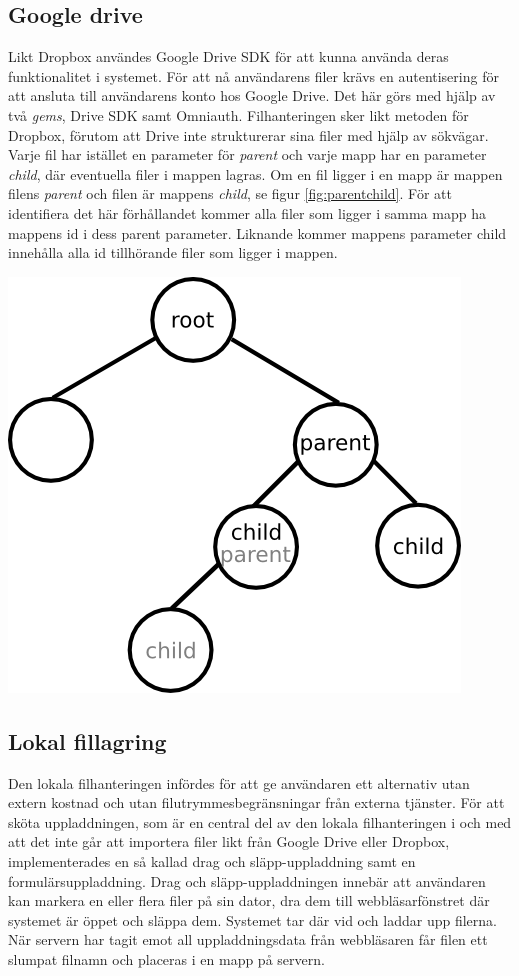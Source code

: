 \subsection{Google drive}
Likt Dropbox användes Google Drive SDK för att kunna använda deras funktionalitet i systemet. För att nå användarens filer krävs en autentisering för att ansluta till användarens konto hos Google Drive. Det här görs med hjälp av två \textit{gems}, Drive SDK samt Omniauth. Filhanteringen sker likt metoden för Dropbox, förutom att Drive inte strukturerar sina filer med hjälp av sökvägar. Varje fil har istället en parameter för \textit{parent} och varje mapp har en parameter \textit{child}, där eventuella filer i mappen lagras. Om en fil ligger i en mapp är mappen filens \textit{parent} och filen är mappens \textit{child}, se figur \ref{fig:parentchild}. För att identifiera det här förhållandet kommer alla filer som ligger i samma mapp ha mappens id i dess parent parameter. Liknande kommer mappens parameter child innehålla alla id tillhörande filer som ligger i mappen.

\begin{Figure}
  \centering
    \includegraphics[width=0.5\linewidth]{figures/pcarent2.png}
\end{Figure}

\subsection{Lokal fillagring} \label{sec:local}
Den lokala filhanteringen infördes för att ge användaren ett alternativ utan extern kostnad och utan filutrymmesbegränsningar från externa tjänster. För att sköta uppladdningen, som är en central del av den lokala filhanteringen i och med att det inte går att importera filer likt från Google Drive eller Dropbox, implementerades en så kallad drag och släpp-uppladdning samt en formulärsuppladdning. Drag och släpp-uppladdningen innebär att användaren kan markera en eller flera filer på sin dator, dra dem till webbläsarfönstret där systemet är öppet och släppa dem. Systemet tar där vid och laddar upp filerna. När servern har tagit emot all uppladdningsdata från webbläsaren får filen ett slumpat filnamn och placeras i en mapp på servern.

